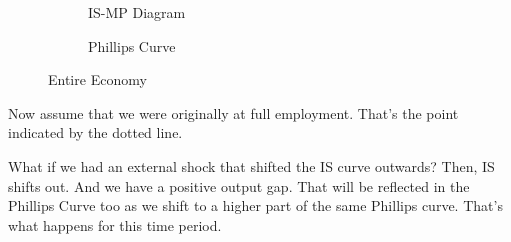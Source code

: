 \documentclass[11pt]{scrartcl}
\newcommand{\og}{\ensuremath{\tilde{Y}}}
\begin{document}
\begin{figure}[H]
\begin{subfigure}[b]{0.5\textwidth}
\centering
{}
\caption{\color{blue}IS-\color{black}MP Diagram}
\end{subfigure}
\hspace{2ex}
\begin{subfigure}[b]{0.5\textwidth}
\centering
{}
\caption{Phillips Curve}
\end{subfigure}
\caption{Entire Economy}
\end{figure}

Now assume that we were originally at full employment. That's the point indicated by the dotted line.

What if we had an external shock that shifted the IS curve outwards? Then, IS shifts out. And we have a positive output gap. That will be reflected in the Phillips Curve too as we shift to a higher part of the same Phillips curve. That's what happens for this time period.
\end{document}
